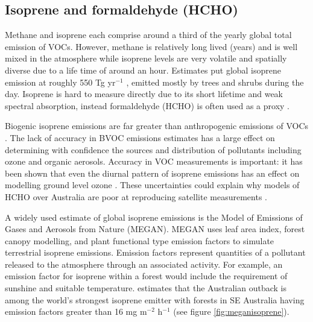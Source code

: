 \subsection{Isoprene and formaldehyde (HCHO)}
\label{proxy}
Methane and isoprene each comprise around a third of the yearly global total emission of VOCs.
However, methane is relatively long lived (years) and is well mixed in the atmosphere while isoprene levels are very volatile and spatially diverse due to a life time of around an hour. Estimates put global isoprene emission at roughly 550 Tg yr$^{−1}$ \cite{Guenther_2006,Monks_2014}, emitted mostly by trees and shrubs during the day.
Isoprene is hard to measure directly due to its short lifetime and weak spectral absorption, instead formaldehyde (HCHO) is often used as a proxy \cite{Marais_2012,bauwens2013satellite}.

Biogenic isoprene emissions are far greater than anthropogenic emissions of VOCs \cite{Guenther_2006}. 
The lack of accuracy in BVOC emissions estimates has a large effect on determining with confidence the sources and distribution of pollutants including ozone and organic aerosols.
Accuracy in VOC measurements is important: it has been shown that even the diurnal pattern of isoprene emissions has an effect on modelling ground level ozone \cite{Hewitt_2011,Fan_2004}.
These uncertainties could explain why models of HCHO over Australia are poor at reproducing satellite measurements \cite{Stavrakou_2008}.

A widely used estimate of global isoprene emissions is the Model of Emissions of Gases and Aerosols from Nature (MEGAN). MEGAN uses leaf area index, forest canopy modelling, and plant functional type emission factors to simulate terrestrial isoprene emissions.
Emission factors represent quantities of a pollutant released to the atmosphere through an associated activity.
For example, an emission factor for isoprene within a forest would include the requirement of sunshine and suitable temperature.
\citet{Guenther_2006} estimates that the Australian outback is among the world's strongest isoprene emitter with forests in SE Australia having emission factors greater than 16 mg m$^{-2}$ h$^{-1}$ (see figure \ref{fig:meganisoprene}).

